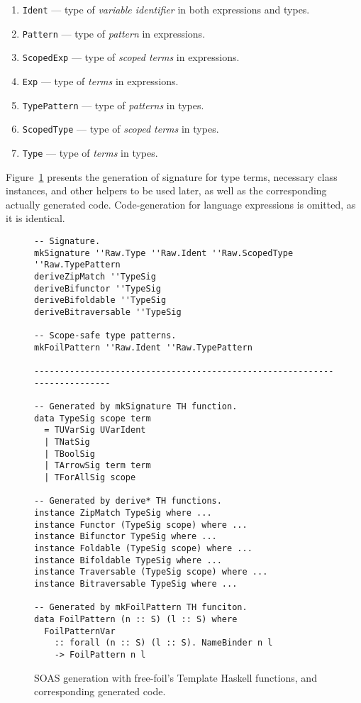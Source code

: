 \begin{enumerate}
  \item \texttt{Ident} — type of \textit{variable identifier} in both expressions and types.
  \item \texttt{Pattern} — type of \textit{pattern} in expressions.
  \item \texttt{ScopedExp} — type of \textit{scoped terms} in expressions.
  \item \texttt{Exp} — type of \textit{terms} in expressions.
  \item \texttt{TypePattern} — type of \textit{patterns} in types.
  \item \texttt{ScopedType} — type of \textit{scoped terms} in types.
  \item \texttt{Type} — type of \textit{terms} in types.
\end{enumerate}

Figure~\ref{fig:soas-gen-types} presents the generation of signature for type terms, necessary class instances, and other helpers to be used later, as well as the corresponding actually generated code. Code-generation for language expressions is omitted, as it is identical.

\begin{figure}[H]
\begin{verbatim}
-- Signature.
mkSignature ''Raw.Type ''Raw.Ident ''Raw.ScopedType ''Raw.TypePattern
deriveZipMatch ''TypeSig
deriveBifunctor ''TypeSig
deriveBifoldable ''TypeSig
deriveBitraversable ''TypeSig

-- Scope-safe type patterns.
mkFoilPattern ''Raw.Ident ''Raw.TypePattern

--------------------------------------------------------------------------

-- Generated by mkSignature TH function.
data TypeSig scope term
  = TUVarSig UVarIdent
  | TNatSig
  | TBoolSig
  | TArrowSig term term
  | TForAllSig scope

-- Generated by derive* TH functions.
instance ZipMatch TypeSig where ...
instance Functor (TypeSig scope) where ...
instance Bifunctor TypeSig where ...
instance Foldable (TypeSig scope) where ...
instance Bifoldable TypeSig where ...
instance Traversable (TypeSig scope) where ...
instance Bitraversable TypeSig where ...

-- Generated by mkFoilPattern TH funciton.
data FoilPattern (n :: S) (l :: S) where
  FoilPatternVar
    :: forall (n :: S) (l :: S). NameBinder n l
    -> FoilPattern n l
\end{verbatim}
  \caption[Generating SOAS (1): signature of type terms]{SOAS generation with free-foil's Template Haskell functions, and corresponding generated code.}
  \label{fig:soas-gen-types}
\end{figure}

